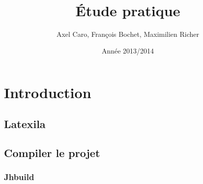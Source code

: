 \documentclass[a4paper,11pt]{report}
\title{Étude pratique}
\author{Axel Caro, François Bochet, Maximilien Richer}
\date{Année 2013/2014}
\begin{document}
\maketitle %
\tableofcontents %

\chapter{Introduction}

\section{Latexila}

\section{Compiler le projet}
\subsection{Jhbuild}
\end{document}
